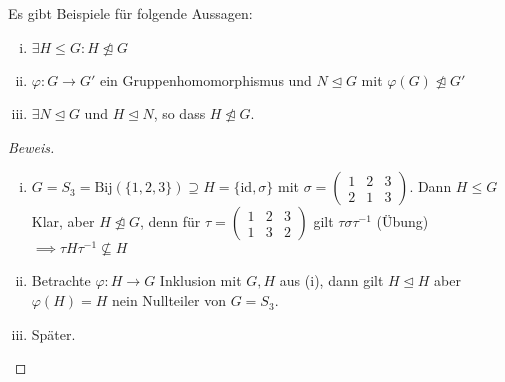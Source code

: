 \documentclass[a4paper]{report}
\begin{document}
\begin{bsp*} Es gibt Beispiele für folgende Aussagen:
  \begin{enumerate}[(i)]
    \item $\exists H \le G : H \not \trianglelefteq G$
    \item $\varphi : G \to G'$ ein Gruppenhomomorphismus und $N \trianglelefteq G$ mit $\varphi(G) \not \trianglelefteq G'$
    \item $\exists N \trianglelefteq G$ und $H \trianglelefteq N$, so dass $H \not \trianglelefteq G$.
  \end{enumerate}
\end{bsp*}
  \begin{proof}[Beweis] \item
  \begin{enumerate}[(i)]
    \item $G = S_{3} = \mathrm{Bij}(\{1,2,3\}) \supseteq H = \{\mathrm{id}, \sigma\}$ mit $\sigma = \begin{pmatrix} 1 & 2 & 3 \\ 2 & 1 & 3\end{pmatrix}$. Dann $H \le G$ Klar, aber $H \not \trianglelefteq G$, denn für $\tau = \begin{pmatrix} 1 & 2 & 3 \\ 1 & 3 & 2\end{pmatrix}$ gilt $\tau \sigma \tau^{-1}$ (Übung) $\implies \tau H\tau^{-1} \not \subseteq H$
    \item Betrachte $\varphi: H \to G$ Inklusion mit $G, H$ aus (i), dann gilt $H \trianglelefteq H$ aber $\varphi(H) = H$ nein Nullteiler von $G = S_{3}$.
    \item Später.
   \end{enumerate}
  \end{proof}
\end{document}
